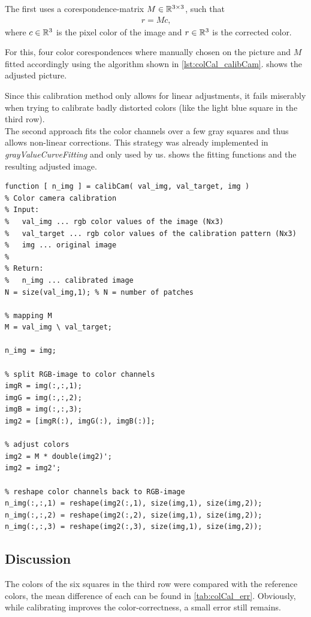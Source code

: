 \documentclass[
a4paper,     %
11pt         %
]{scrartcl}  %
\begin{document}
The first uses a corespondence-matrix $M \in \mathbb{R} ^{3\times 3}$, such that
\begin{align*}  r = M c \text{,} \end{align*}
where $c \in \mathbb{R}^3$ is the pixel color of the image and $r \in \mathbb{R}^3$ is the corrected color.

For this, four color corespondences where manually chosen on the picture and $M$ fitted accordingly using the algorithm shown in \cref{lst:colCal_calibCam}.  shows the adjusted picture.

Since this calibration method only allows for linear adjustments, it fails miserably when trying to calibrate badly distorted colors (like the light blue square in the third row). \\

The second approach fits the color channels over a few gray squares and thus allows non-linear corrections. This strategy was already implemented in \textit{grayValueCurveFitting} and only used by us.  shows the fitting functions and the resulting adjusted image.

\begin{lstlisting}[label=lst:colCal_calibCam, caption=MATLAB implementation of calibCam]
function [ n_img ] = calibCam( val_img, val_target, img )
% Color camera calibration
% Input:
%   val_img ... rgb color values of the image (Nx3)
%   val_target ... rgb color values of the calibration pattern (Nx3)
%   img ... original image
%
% Return:
%   n_img ... calibrated image
N = size(val_img,1); % N = number of patches

% mapping M
M = val_img \ val_target;

n_img = img;

% split RGB-image to color channels
imgR = img(:,:,1);
imgG = img(:,:,2);
imgB = img(:,:,3);
img2 = [imgR(:), imgG(:), imgB(:)];

% adjust colors
img2 = M * double(img2)';
img2 = img2';

% reshape color channels back to RGB-image
n_img(:,:,1) = reshape(img2(:,1), size(img,1), size(img,2));
n_img(:,:,2) = reshape(img2(:,2), size(img,1), size(img,2));
n_img(:,:,3) = reshape(img2(:,3), size(img,1), size(img,2));
\end{lstlisting}

\subsection{Discussion}
The colors of the six squares in the third row were compared with the reference colors, the mean difference of each can be found in \cref{tab:colCal_err}. Obviously, while calibrating improves the color-correctness, a small error still remains.
\end{document}
